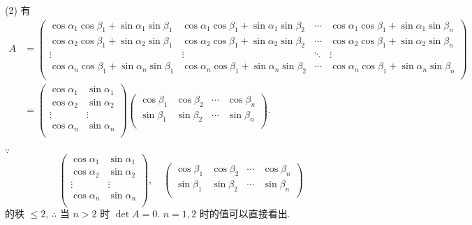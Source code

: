 \documentclass{ctexart}
\begin{document}
\begin{solution}
    (2) 有
    \begin{align*}
        A & =\begin{pmatrix}
            \cos\alpha_1\cos\beta_1+\sin\alpha_1\sin\beta_1 & \cos\alpha_1\cos\beta_1+\sin\alpha_1\sin\beta_2 & \cdots & \cos\alpha_1\cos\beta_1+\sin\alpha_1\sin\beta_n \\
            \cos\alpha_2\cos\beta_1+\sin\alpha_2\sin\beta_1 & \cos\alpha_2\cos\beta_1+\sin\alpha_2\sin\beta_2 & \cdots & \cos\alpha_2\cos\beta_1+\sin\alpha_2\sin\beta_n \\
            \vdots & \vdots & \ddots & \vdots \\
            \cos\alpha_n\cos\beta_1+\sin\alpha_n\sin\beta_1 & \cos\alpha_n\cos\beta_1+\sin\alpha_n\sin\beta_2 & \cdots & \cos\alpha_n\cos\beta_1+\sin\alpha_n\sin\beta_n \\
        \end{pmatrix} \\
        & =\begin{pmatrix}
            \cos\alpha_1 & \sin\alpha_1 \\
            \cos\alpha_2 & \sin\alpha_2 \\
            \vdots & \vdots \\
            \cos\alpha_n & \sin\alpha_n \\
        \end{pmatrix}\begin{pmatrix}
            \cos\beta_1 & \cos\beta_2 & \cdots & \cos\beta_n \\
            \sin\beta_1 & \sin\beta_2 & \cdots & \sin\beta_n \\
        \end{pmatrix}.
    \end{align*}

    $\because$
    \[\begin{pmatrix}
        \cos\alpha_1 & \sin\alpha_1 \\
        \cos\alpha_2 & \sin\alpha_2 \\
        \vdots & \vdots \\
        \cos\alpha_n & \sin\alpha_n \\
    \end{pmatrix},\quad\begin{pmatrix}
        \cos\beta_1 & \cos\beta_2 & \cdots & \cos\beta_n \\
        \sin\beta_1 & \sin\beta_2 & \cdots & \sin\beta_n \\
    \end{pmatrix}\]
    的秩 $\leq2$, $\therefore$ 当 $n>2$ 时 $\det A=0$. $n=1,2$ 时的值可以直接看出.
\end{solution}
\end{document}
